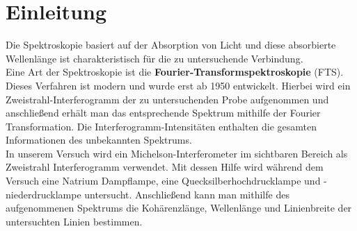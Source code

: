 \chapter{Einleitung}
Die Spektroskopie basiert auf der Absorption von Licht und diese absorbierte Wellenlänge ist charakteristisch
für die zu untersuchende Verbindung. \\
Eine Art der Spektroskopie ist die \textbf{Fourier-Transformspektroskopie} (FTS).
Dieses Verfahren ist modern und wurde erst ab 1950 entwickelt. Hierbei 
wird ein Zweistrahl-Interferogramm der zu untersuchenden Probe aufgenommen und anschließend
erhält man das entsprechende Spektrum mithilfe der Fourier Transformation. Die Interferogramm-Intensitäten 
enthalten die gesamten Informationen des unbekannten Spektrums. \\

In unserem Versuch wird ein Michelson-Interferometer im sichtbaren Bereich als Zweistrahl
Interferogramm verwendet. Mit dessen Hilfe wird während dem Versuch eine Natrium Dampflampe,
eine Quecksilberhochdrucklampe und -niederdrucklampe untersucht. Anschließend kann man mithilfe
des aufgenommenen Spektrums die Kohärenzlänge, Wellenlänge und Linienbreite der untersuchten 
Linien bestimmen. 
